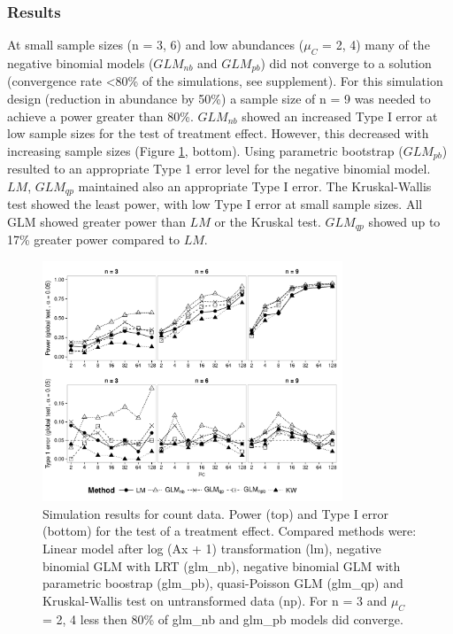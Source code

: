 \documentclass{scrartcl}
\begin{document}
\subsubsection{Results}
At small sample sizes (n = {3, 6}) and low abundances ($\mu_C$ = {2, 4}) many of the negative binomial models ($GLM_{nb}$ and $GLM_{pb}$) did not converge to a solution (convergence rate \textless 80\% of the simulations, see supplement).  
For this simulation design (reduction in abundance by 50\%) a sample size of n = 9 was needed to achieve a power greater than 80\%.
$GLM_{nb}$ showed an increased Type I error at low sample sizes for the test of treatment effect. 
However, this decreased with increasing sample sizes (Figure \ref{fig:p_glob_c}, bottom).
Using parametric bootstrap ($GLM_{pb}$) resulted to an appropriate Type 1 error level for the negative binomial model.
$LM$, $GLM_{qp}$ maintained also an appropriate Type I error.
The Kruskal-Wallis test showed the least power, with low Type I error at small sample sizes. 
All GLM showed greater power than $LM$ or the Kruskal test. 
$GLM_{qp}$ showed up to 17\% greater power compared to $LM$.

\begin{figure}[h]
  \centering
  \includegraphics[width = 0.8\textwidth]{p_glob_c.pdf}
  \caption{Simulation results for count data. Power (top) and Type I error (bottom) for the test of a treatment effect. Compared methods were: Linear model after log (Ax + 1) transformation (lm), negative binomial GLM with LRT (glm\_nb), negative binomial GLM with parametric boostrap (glm\_pb), quasi-Poisson GLM (glm\_qp) and Kruskal-Wallis test on untransformed data (np).
  For n = 3 and $\mu_C$ = {2, 4} less then 80\% of glm\_nb and glm\_pb models did converge.}
  \label{fig:p_glob_c}
\end{figure}
\end{document}
